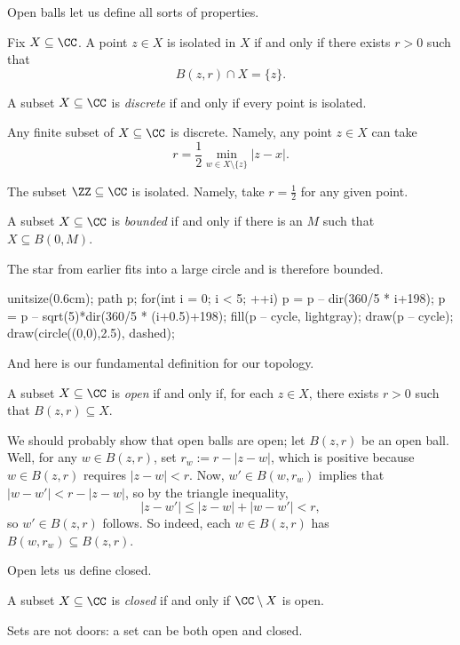 Open balls let us define all sorts of properties.
\begin{defi}[Isolated]
	Fix $X\subseteq\CC$. A point $z\in X$ is isolated in $X$ if and only if there exists $r>0$ such that
	\[B(z,r)\cap X=\{z\}.\]
\end{defi}
\begin{definition}[Discrete]
	A subset $X\subseteq\CC$ is \textit{discrete} if and only if every point is isolated.
\end{definition}
\begin{example}
	Any finite subset of $X\subseteq\CC$ is discrete. Namely, any point $z\in X$ can take
	\[r=\frac12\min_{w\in X\setminus\{z\}}|z-x|.\]
\end{example}
\begin{example}
	The subset $\ZZ\subseteq\CC$ is isolated. Namely, take $r=\frac12$ for any given point.
\end{example}
\begin{definition}[Bounded]
	A subset $X\subseteq\CC$ is \textit{bounded} if and only if there is an $M$ such that $X\subseteq B(0,M)$.
\end{definition}
\begin{example}
	The star from earlier fits into a large circle and is therefore bounded.
	\begin{center}
		\begin{asy}
			unitsize(0.6cm);
			path p;
			for(int i = 0; i < 5; ++i)
			{
				p = p -- dir(360/5 * i+198);
				p = p -- sqrt(5)*dir(360/5 * (i+0.5)+198);
			}
			fill(p -- cycle, lightgray);
			draw(p -- cycle);
			draw(circle((0,0),2.5), dashed);
		\end{asy}
	\end{center}
\end{example}
And here is our fundamental definition for our topology.
\begin{defi}[Open]
	A subset $X\subseteq\CC$ is \textit{open} if and only if, for each $z\in X$, there exists $r>0$ such that $B(z,r)\subseteq X$.
\end{defi}
\begin{remark}[Nir]
	We should probably show that open balls are open; let $B(z,r)$ be an open ball. Well, for any $w\in B(z,r)$, set $r_w:=r-|z-w|$, which is positive because $w\in B(z,r)$ requires $|z-w|<r$. Now, $w'\in B(w,r_w)$ implies that $|w-w'|<r-|z-w|$, so by the triangle inequality,
	\[|z-w'|\le|z-w|+|w-w'|<r,\]
	so $w'\in B(z,r)$ follows. So indeed, each $w\in B(z,r)$ has $B(w,r_w)\subseteq B(z,r)$.
\end{remark}
Open lets us define closed.
\begin{definition}[Closed]
	A subset $X\subseteq\CC$ is \textit{closed} if and only if $\CC\setminus X$ is open.
\end{definition}
\begin{warn}
	Sets are not doors: a set can be both open and closed.
\end{warn}

